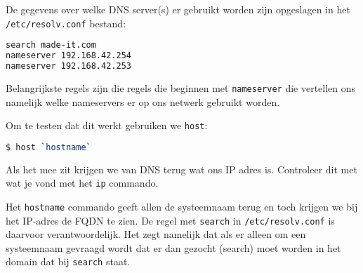 De gegevens over welke DNS server(s) er gebruikt worden zijn opgeslagen in het \texttt{/etc/resolv.conf} bestand:
\begin{lstlisting}[language=bash]
search made-it.com
nameserver 192.168.42.254
nameserver 192.168.42.253
\end{lstlisting}
Belangrijkste regels zijn die regels die beginnen met \texttt{nameserver} die vertellen ons namelijk welke nameservers er op ons netwerk gebruikt worden.

Om te testen dat dit werkt gebruiken we \texttt{host}:
\begin{lstlisting}[language=bash]
$ host `hostname`
\end{lstlisting}
Als het mee zit krijgen we van DNS terug wat ons IP adres is. Controleer dit met wat je vond met het \texttt{ip} commando.

Het \texttt{hostname} commando geeft allen de systeemnaam terug en toch krijgen we bij het IP-adres de FQDN te zien. De regel met \texttt{search} in \texttt{/etc/resolv.conf} is daarvoor verantwoordelijk. Het zegt namelijk dat als er alleen om een systeemnaam gevraagd wordt dat er dan gezocht (search) moet worden in het domain dat bij \texttt{search} staat.

